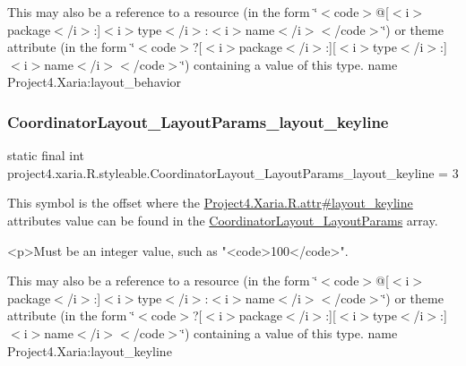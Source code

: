 This may also be a reference to a resource (in the form \char`\"{}$<$code$>$@\mbox{[}$<$i$>$package$<$/i$>$\+:\mbox{]}$<$i$>$type$<$/i$>$\+:$<$i$>$name$<$/i$>$$<$/code$>$\char`\"{}) or theme attribute (in the form \char`\"{}$<$code$>$?\mbox{[}$<$i$>$package$<$/i$>$\+:\mbox{]}\mbox{[}$<$i$>$type$<$/i$>$\+:\mbox{]}$<$i$>$name$<$/i$>$$<$/code$>$\char`\"{}) containing a value of this type.  name Project4.\+Xaria\+:layout\+\_\+behavior \mbox{\label{classproject4_1_1xaria_1_1R_1_1styleable_a9e5e38d49198f35609d9b905af511517}} 
\subsubsection{\texorpdfstring{Coordinator\+Layout\+\_\+\+Layout\+Params\+\_\+layout\+\_\+keyline}{CoordinatorLayout\_LayoutParams\_layout\_keyline}}
{\footnotesize\ttfamily static final int project4.\+xaria.\+R.\+styleable.\+Coordinator\+Layout\+\_\+\+Layout\+Params\+\_\+layout\+\_\+keyline = 3\hspace{0.3cm}{\ttfamily [static]}}

This symbol is the offset where the \hyperlink{}{Project4.\+Xaria.\+R.\+attr\#layout\+\_\+keyline} attribute\textquotesingle{}s value can be found in the \hyperlink{classproject4_1_1xaria_1_1R_1_1styleable_ad7c97c688ef4dae4ebe89418a84dab5d}{Coordinator\+Layout\+\_\+\+Layout\+Params} array.

\begin{DoxyVerb}      <p>Must be an integer value, such as "<code>100</code>".
\end{DoxyVerb}
 

This may also be a reference to a resource (in the form \char`\"{}$<$code$>$@\mbox{[}$<$i$>$package$<$/i$>$\+:\mbox{]}$<$i$>$type$<$/i$>$\+:$<$i$>$name$<$/i$>$$<$/code$>$\char`\"{}) or theme attribute (in the form \char`\"{}$<$code$>$?\mbox{[}$<$i$>$package$<$/i$>$\+:\mbox{]}\mbox{[}$<$i$>$type$<$/i$>$\+:\mbox{]}$<$i$>$name$<$/i$>$$<$/code$>$\char`\"{}) containing a value of this type.  name Project4.\+Xaria\+:layout\+\_\+keyline \mbox{\label{classproject4_1_1xaria_1_1R_1_1styleable_a844b169229d25fbc371d4d62c12462f8}} 
